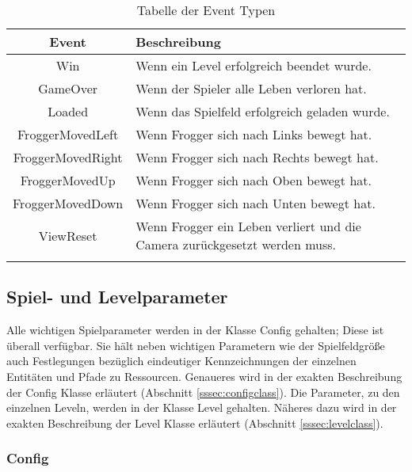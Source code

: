 \documentclass[a4paper,10pt]{report}
\begin{document}
{{{				\begin{longtable}{|c|p{}|}
				\hline
				\textbf{Event} & \textbf{Beschreibung} \\
				\hline
				Win 				& Wenn ein Level erfolgreich beendet wurde. 		\\
				\hline				
				GameOver 			& Wenn der Spieler alle Leben verloren hat. 		\\
				\hline
				Loaded 				& Wenn das Spielfeld erfolgreich geladen wurde.		\\
				\hline	
				FroggerMovedLeft 	& Wenn Frogger sich nach Links bewegt hat.			\\
				\hline	
				FroggerMovedRight 	& Wenn Frogger sich nach Rechts bewegt hat.			\\
				\hline	
				FroggerMovedUp 		& Wenn Frogger sich nach Oben bewegt hat.			\\
				\hline	
				FroggerMovedDown 	& Wenn Frogger sich nach Unten bewegt hat.			\\
				\hline	
				ViewReset 			& Wenn Frogger ein Leben verliert und die Camera zurückgesetzt werden muss. \\
				\hline	
				\caption{Tabelle der Event Typen}
				\end{longtable}												 
			}			
			
		}		
		
		\subsection{Spiel- und Levelparameter}
		{
			\label{ssec:parameters}
			
			Alle wichtigen Spielparameter werden in der Klasse Config gehalten; Diese ist überall verfügbar.
			Sie hält neben wichtigen Parametern wie der Spielfeldgröße auch Festlegungen bezüglich eindeutiger 
			Kennzeichnungen der einzelnen Entitäten und Pfade zu Ressourcen.
			Genaueres wird in der exakten Beschreibung der Config Klasse erläutert (Abschnitt \ref{sssec:configclass}).
			\newline \newline
			Die Parameter, zu den einzelnen Leveln, werden in der Klasse Level gehalten. 
			Näheres dazu wird in der exakten Beschreibung der Level Klasse erläutert (Abschnitt \ref{sssec:levelclass}).		
			\newpage
			\subsubsection{Config}
			{
				\label{sssec:configclass}
				
}}}
\end{document}
